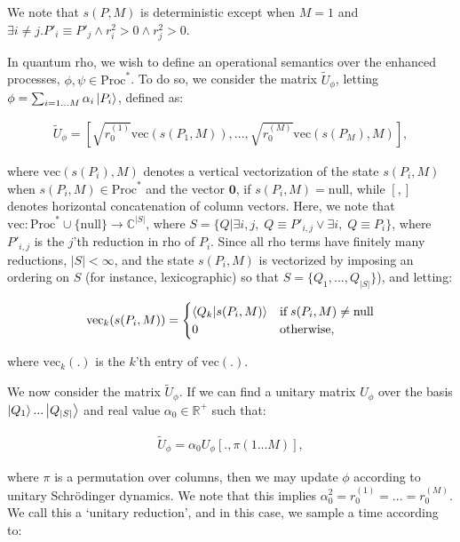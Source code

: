 \noindent We note that $s(P,M)$ is deterministic except when $M=1$ and $\exists i\neq j. P'_i \equiv P'_j \wedge r^2_i>0 \wedge r^2_j > 0$.

In quantum rho, we wish to define an operational semantics over the enhanced processes, $\phi,\psi\in \text{Proc}^*$.  To do so, we consider the matrix $\tilde{U}_{\phi}$, letting $\phi=\sum_{i=1...M} \alpha_i \ket{P_i}$, defined as:

\begin{eqnarray}
\tilde{U}_{\phi} = \left[\sqrt{r_0^{(1)}}\text{vec}(s(P_1,M)), ... , \sqrt{r_0^{(M)}}\text{vec}(s(P_M),M)\right],
\end{eqnarray}

\noindent where $\text{vec}(s(P_i),M)$ denotes a vertical vectorization of the state $s(P_i,M)$ when $s(P_i,M) \in \text{Proc}^*$ and the vector $\mathbf{0}$, if $s(P_i,M)=\text{null}$, while $[,]$ denotes horizontal concatenation of column vectors.  Here, we note that $\text{vec}:\text{Proc}^*\cup\{\text{null}\} \rightarrow \mathbb{C}^{|S|}$, where $S=\{Q|\exists i,j, \; Q\equiv P'_{i,j} \vee \exists i, \; Q\equiv P_i\}$, where $P'_{i,j}$ is the $j$'th reduction in rho of $P_i$.  Since all rho terms have finitely many reductions, $|S|<\infty$, and the state $s(P_i,M)$ is vectorized by imposing an ordering on $S$ (for instance, lexicographic) so that $S=\{Q_1,...,Q_{|S|}\}$), and letting:

\begin{eqnarray}
\text{vec}_k(s(P_i,M)) = 
\begin{cases}
\braket{Q_k}{s(P_i,M)} & \text{if} \; s(P_i,M) \neq \text{null} \\
0 & \text{otherwise,}
\end{cases}
\end{eqnarray}

\noindent where $\text{vec}_k(.)$ is the $k$'th entry of $\text{vec}(.)$.

We now consider the matrix $\tilde{U}_\phi$.  If we can find a unitary matrix $U_\phi$ over the basis $\ket{Q_1}...\ket{Q_{|S|}}$ and real value $\alpha_0\in \mathbb{R}^+$ such that:

\begin{eqnarray}\label{eq:unitary}
\tilde{U}_\phi = \alpha_0 U_\phi[.,\pi(1...M)],
\end{eqnarray}

\noindent where $\pi$ is a permutation over columns, then we may update $\phi$ according to unitary Schr\"odinger dynamics.  We note that this implies $\alpha^2_0=r_0^{(1)}=...=r_0^{(M)}$.  We call this a `unitary reduction', and in this case, we sample a time according to:

